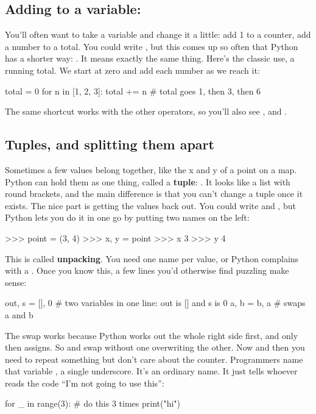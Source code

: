 \documentclass[10pt,a4paper]{article}
\begin{document}
\subsection{Adding to a variable: \code{+=\allowbreak{}}}
You’ll often want to take a variable and change it a little: add 1 to a counter, add a number to a total. You could write , but this comes up so often that Python has a shorter way: . It means exactly the same thing.
Here’s the classic use, a running total. We start at zero and add each number as we reach it:
\begin{pycode}
total = 0
for n in [1, 2, 3]:
    total += n      # total goes 1, then 3, then 6
\end{pycode}
The same shortcut works with the other operators, so you’ll also see ,  and .
\subsection{Tuples, and splitting them apart}
Sometimes a few values belong together, like the x and y of a point on a map. Python can hold them as one thing, called a \textbf{tuple}: . It looks like a list with round brackets, and the main difference is that you can’t change a tuple once it exists.
The nice part is getting the values back out. You could write  and , but Python lets you do it in one go by putting two names on the left:
\begin{txtcode}
>>> point = (3, 4)
>>> x, y = point
>>> x
3
>>> y
4
\end{txtcode}
This is called \textbf{unpacking}. You need one name per value, or Python complains with a .
Once you know this, a few lines you’d otherwise find puzzling make sense:
\begin{pycode}
out, s = [], 0          # two variables in one line: out is [] and s is 0
a, b = b, a             # swaps a and b
\end{pycode}
The swap works because Python works out the whole right side first, and only then assigns. So  and  swap without one overwriting the other.
Now and then you need to repeat something but don’t care about the counter. Programmers name that variable \code{\_}, a single underscore. It’s an ordinary name. It just tells whoever reads the code “I’m not going to use this”:
\begin{pycode}
for _ in range(3):      # do this 3 times
    print("hi")
\end{pycode}
\end{document}

